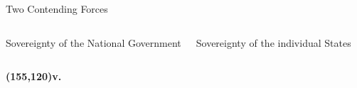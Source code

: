 \begin{frame}{Two Contending Forces}
    \begin{columns}[onlytextwidth]
            \begin{varblock}[0.9\textwidth]{}\huge{ \centering Sovereignty of the National Government \\}\end{varblock}

            \begin{varblock}[0.9\textwidth]{}\huge{ \centering Sovereignty of the individual States \\}\end{varblock}
    \end{columns}
    \textbf{\huge{ \color{red}
        \Put(155,120){v.}
    }}
\end{frame}
    
